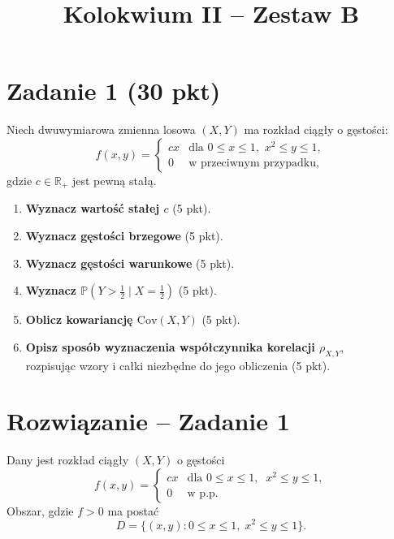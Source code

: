 \documentclass[polish, 10pt]{extarticle}
\begin{document}
\title{Kolokwium II -- Zestaw B}
\author{}
\date{}

\maketitle
\vspace{-2cm}

\section*{Zadanie 1 (30 pkt)}
Niech dwuwymiarowa zmienna losowa $(X, Y)$ ma rozkład ciągły o gęstości:
\[
f(x,y) = 
\begin{cases} 
cx & \text{dla } 0 \le x \le 1, \,\, x^2 \le y \le 1, \\
0 & \text{w przeciwnym przypadku,}
\end{cases}
\]
gdzie $c \in \mathbb{R_+}$ jest pewną stałą.

\begin{enumerate}
    \item[a)] \textbf{Wyznacz wartość stałej $c$} \hfill (5 pkt).
    \item[b)] \textbf{Wyznacz gęstości brzegowe} \hfill (5 pkt).
    \item[c)] \textbf{Wyznacz gęstości warunkowe} \hfill (5 pkt).
    \item[d)] \textbf{Wyznacz $\mathbb P\!\left(Y>\tfrac12\mid X=\tfrac12\right)$} \hfill (5 pkt).
    \item[e)] \textbf{Oblicz kowariancję $\text{Cov}(X, Y)$} \hfill (5 pkt).
    \item[f)] \textbf{Opisz sposób wyznaczenia współczynnika korelacji $\rho_{X,Y}$},\\rozpisując wzory i całki niezbędne do jego obliczenia \hfill (5 pkt).
\end{enumerate}

\section*{Rozwiązanie -- Zadanie 1}

Dany jest rozkład ciągły $(X,Y)$ o gęstości
\[
f(x,y)=
\begin{cases}
cx & \text{dla } 0\le x\le 1,\;\; x^2\le y\le 1,\\
0 & \text{w p.p.}
\end{cases}
\]
Obszar, gdzie $f>0$ ma postać
\[
D=\{(x,y): 0\le x\le 1,\; x^2\le y\le 1\}.
\]
\end{document}
